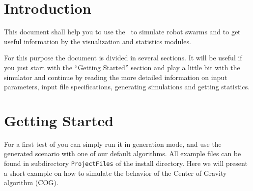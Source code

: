 \documentclass[a4paper,halfparskip,11pt,twoside]{scrartcl}
\begin{document}
\init{}


\section{Introduction}
This document shall help you to use the \RSS\ to simulate robot swarms and to get useful information by the visualization and statistics modules.

For this purpose the document is divided in several sections. It will be useful if you just start with the ``Getting Started'' section and play a little bit with the simulator and continue by reading the more detailed information on input parameters, input file specifications, generating simulations and getting statistics.


\section{Getting Started}
For a first test of \RSS you can simply run it in generation mode, and use the generated scenario with one of our default algorithms. All example files can be found in subdirectory {\tt ProjectFiles} of the install directory. Here we will present a short example on how to simulate the behavior of the {\sffamily Center of Gravity} algorithm (COG).
\end{document}
